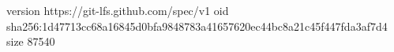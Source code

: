 version https://git-lfs.github.com/spec/v1
oid sha256:1d47713cc68a16845d0bfa9848783a41657620ec44bc8a21c45f447fda3af7d4
size 87540

